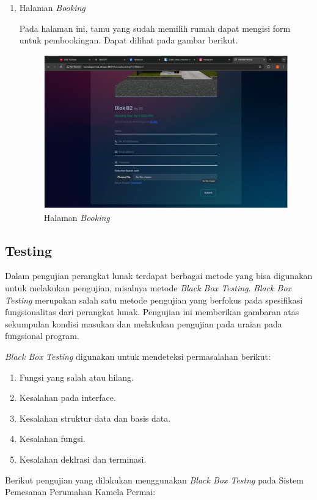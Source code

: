 \begin{enumerate}
    \item Halaman \textit{Booking}
    \par Pada halaman ini, tamu yang sudah memilih rumah dapat mengisi form untuk pembookingan. Dapat dilihat pada gambar berikut.
    \begin{figure}
        \centering
        \includegraphics[width=0.75\linewidth]{Implementasi/Booking.png}
        \caption{Halaman \textit{Booking}}
    \end{figure}
    
\end{enumerate}

\subsection{Testing}
\par Dalam pengujian perangkat lunak terdapat berbagai metode yang bisa digunakan untuk melakukan pengujian, misalnya metode \textit{Black Box Testing}. \textit{Black Box Testing} merupakan salah satu metode pengujian yang berfokus pada spesifikasi fungsionalitas dari perangkat lunak. Pengujian ini memberikan gambaran atas sekumpulan kondisi masukan dan melakukan pengujian pada uraian pada fungsional program.
\par \textit{Black Box Testing} digunakan untuk mendeteksi permasalahan berikut:

\begin{enumerate}
\item Fungsi yang salah atau hilang.
\item Kesalahan pada interface.
\item Kesalahan struktur data dan basis data.
\item Kesalahan fungsi.
\item Kesalahan deklrasi dan terminasi.
\end{enumerate}

\par Berikut pengujian yang dilakukan menggunakan \textit{Black Box Testng} pada Sistem Pemesanan Perumahan Kamela Permai:

